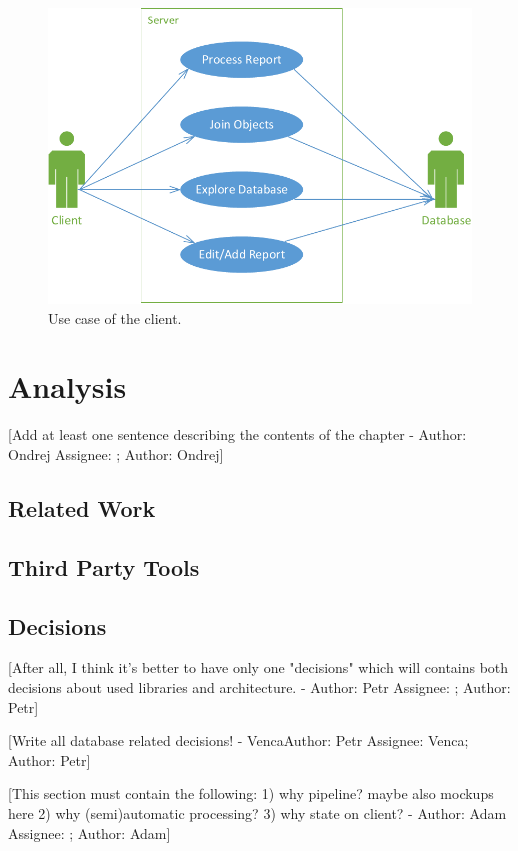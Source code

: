 \documentclass[12pt,a4paper]{report}
\makeatletter
\newcommand{\comment}[3][\@empty]{
  {\color{magenta}[#3 - }
  {\color{green}\ifx\@empty#1\relax Author: #2 \else Assignee: #1; Author: #2\fi}{\color{magenta}]}
}
\makeatother
\begin{document}
\begin{figure}[!htb]
        \centering
        \includegraphics[width=\textwidth]{Images/UseCase2}
        \caption{Use case of the client.}
        \label{fig:UseCase2}
\end{figure}

\chapter{Analysis}

\comment{Ondrej}{Add at least one sentence describing the contents of the
chapter}

\section{Related Work}


\section{Third Party Tools}


\section{Decisions}
\label{sec:Decisions}

\comment{Petr}{After all, I think it's better to have only one "decisions" which
will contains both decisions about used libraries and architecture.}

\comment[Venca]{Petr}{\huge{Write all database related decisions!}}

\comment{Adam}{This section must contain the following:
1) why pipeline? maybe also mockups here
2) why (semi)automatic processing?
3) why state on client?}
\end{document}
